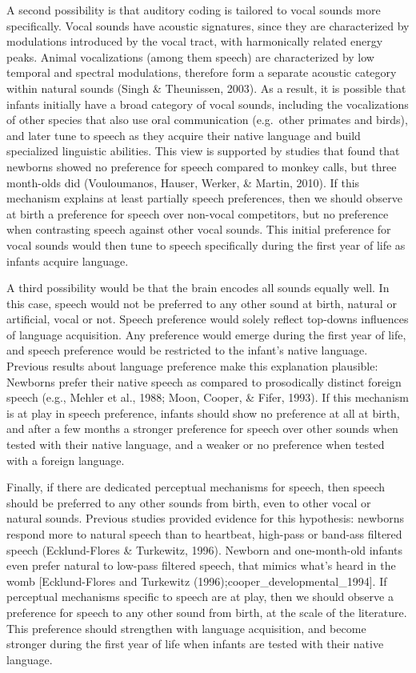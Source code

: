 \documentclass[
  english,
  man]{apa6}
\begin{document}
A second possibility is that auditory coding is tailored to vocal sounds more specifically. Vocal sounds have acoustic signatures, since they are characterized by modulations introduced by the vocal tract, with harmonically related energy peaks. Animal vocalizations (among them speech) are characterized by low temporal and spectral modulations, therefore form a separate acoustic category within natural sounds (Singh \& Theunissen, 2003). As a result, it is possible that infants initially have a broad category of vocal sounds, including the vocalizations of other species that also use oral communication (e.g.~other primates and birds), and later tune to speech as they acquire their native language and build specialized linguistic abilities. This view is supported by studies that found that newborns showed no preference for speech compared to monkey calls, but three month-olds did (Vouloumanos, Hauser, Werker, \& Martin, 2010). If this mechanism explains at least partially speech preferences, then we should observe at birth a preference for speech over non-vocal competitors, but no preference when contrasting speech against other vocal sounds. This initial preference for vocal sounds would then tune to speech specifically during the first year of life as infants acquire language.

A third possibility would be that the brain encodes all sounds equally well. In this case, speech would not be preferred to any other sound at birth, natural or artificial, vocal or not. Speech preference would solely reflect top-downs influences of language acquisition. Any preference would emerge during the first year of life, and speech preference would be restricted to the infant's native language. Previous results about language preference make this explanation plausible: Newborns prefer their native speech as compared to prosodically distinct foreign speech (e.g., Mehler et al., 1988; Moon, Cooper, \& Fifer, 1993). If this mechanism is at play in speech preference, infants should show no preference at all at birth, and after a few months a stronger preference for speech over other sounds when tested with their native language, and a weaker or no preference when tested with a foreign language.

Finally, if there are dedicated perceptual mechanisms for speech, then speech should be preferred to any other sounds from birth, even to other vocal or natural sounds. Previous studies provided evidence for this hypothesis: newborns respond more to natural speech than to heartbeat, high-pass or band-ass filtered speech (Ecklund-Flores \& Turkewitz, 1996). Newborn and one-month-old infants even prefer natural to low-pass filtered speech, that mimics what's heard in the womb {[}Ecklund-Flores and Turkewitz (1996);cooper\_developmental\_1994{]}. If perceptual mechanisms specific to speech are at play, then we should observe a preference for speech to any other sound from birth, at the scale of the literature. This preference should strengthen with language acquisition, and become stronger during the first year of life when infants are tested with their native language.
\end{document}
